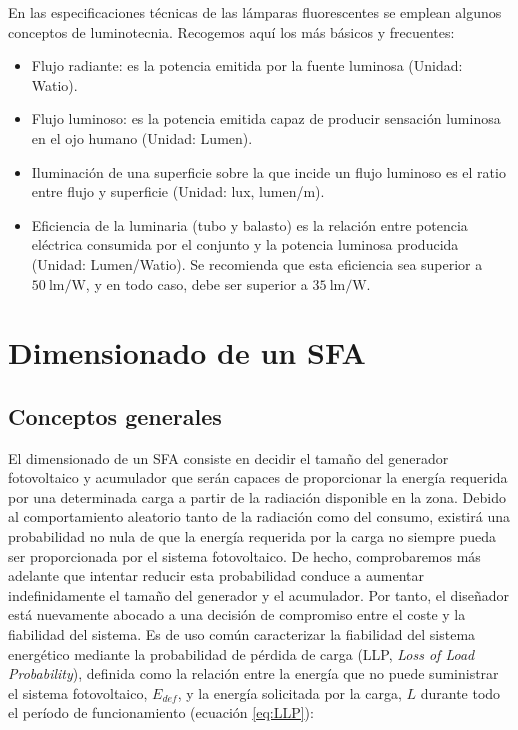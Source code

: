 En las especificaciones técnicas de las lámparas fluorescentes se
emplean algunos conceptos de luminotecnia. Recogemos aquí los más
básicos y frecuentes:
\begin{itemize}
\item Flujo radiante: es la potencia emitida por la fuente luminosa (Unidad:
Watio).
\item Flujo luminoso: es la potencia emitida capaz de producir sensación
luminosa en el ojo humano (Unidad: Lumen).
\item Iluminación de una superficie sobre la que incide un flujo luminoso
es el ratio entre flujo y superficie (Unidad: lux, lumen/m\texttwosuperior{}).
\item Eficiencia de la luminaria (tubo y balasto) es la relación entre potencia
eléctrica consumida por el conjunto y la potencia luminosa producida
(Unidad: Lumen/Watio). Se recomienda que esta eficiencia sea superior
a $\SI{50}{\lumen\per\watt}$, y en todo caso, debe ser superior a
$\SI{35}{\lumen\per\watt}$. 
\end{itemize}

\section{Dimensionado de un SFA\label{sec:DimensionadoSFA}}


\subsection{Conceptos generales}

El dimensionado de un SFA consiste en decidir el tamaño del generador
fotovoltaico y acumulador que serán capaces de proporcionar la energía
requerida por una determinada carga a partir de la radiación disponible
en la zona. Debido al comportamiento aleatorio tanto de la radiación
como del consumo, existirá una probabilidad no nula de que la energía
requerida por la carga no siempre pueda ser proporcionada por el sistema
fotovoltaico. De hecho, comprobaremos más adelante que intentar reducir
esta probabilidad conduce a aumentar indefinidamente el tamaño del
generador y el acumulador. Por tanto, el diseñador está nuevamente
abocado a una decisión de compromiso entre el coste y la fiabilidad
del sistema. Es de uso común caracterizar la fiabilidad del sistema
energético mediante la probabilidad de pérdida de carga (LLP, \emph{Loss
of Load Probability}), definida como la relación entre la energía
que no puede suministrar el sistema fotovoltaico, $E_{def}$,
y la energía solicitada por la carga, $L$ durante todo el período
de funcionamiento (ecuación \ref{eq:LLP}):

